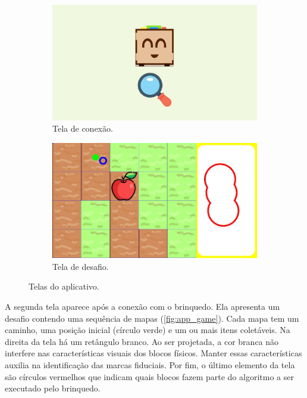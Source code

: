 \begin{figure}[!h]
    \begin{subfigure}{.5\textwidth}
        \centering
        \includegraphics[width=.9\linewidth,fbox]{figs/app_connection.jpeg}
        \caption{Tela de conexão.}
        \label{fig:app_connection}
    \end{subfigure}
    \begin{subfigure}{.5\textwidth}
        \centering
        \includegraphics[width=.9\linewidth,fbox]{figs/app_game.jpeg}
        \caption{Tela de desafio.}
        \label{fig:app_game}
    \end{subfigure}
    \caption{Telas do aplicativo.}
    \label{fig:app_screens}
\end{figure}

A segunda tela aparece após a conexão com o brinquedo. Ela apresenta um desafio contendo uma sequência de mapas (\autoref{fig:app_game}). Cada mapa tem um caminho, uma posição inicial (círculo verde) e um ou mais itens coletáveis. Na direita da tela há um retângulo branco. Ao ser projetada, a cor branca não interfere nas características visuais dos blocos físicos. Manter essas características auxilia na identificação das marcas fiduciais. Por fim, o último elemento da tela são círculos vermelhos que indicam quais blocos fazem parte do algoritmo a ser executado pelo brinquedo. 

